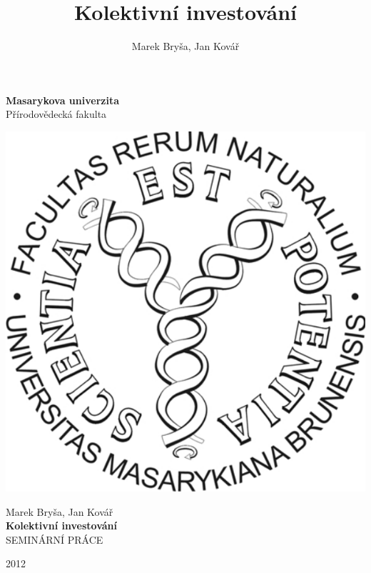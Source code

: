 \documentclass{beamer}
\begin{document}
\author{Marek Bryša, Jan Kovář}
\title{Kolektivní investování}

\begin{frame}

\vfill
\begin{center}
\thispagestyle{empty}
{\Large \bf Masarykova univerzita\\[1ex]}
{\large Přírodovědecká fakulta}
\end{center}
\vfill
\begin{center}
\includegraphics[scale=0.3]{prf_logo.pdf}
\end{center}
\begin{center}
\vfill

Marek Bryša, Jan Kovář\\[3em]
{\LARGE \bf Kolektivní investování}\\[1em]
SEMINÁRNÍ PRÁCE\\
\vfill

{2012}
\end{center}

\end{frame}
\end{document}
